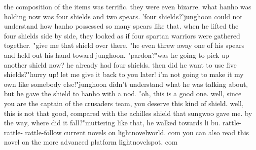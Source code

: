 the composition of the items was terrific.
 they were even bizarre.
what hanho was holding now was four shields and two spears.
'four shields?'junghoon could not understand how hanho possessed so many spears like that.
 when he lifted the four shields side by side, they looked as if four spartan warriors were gathered together.
"give me that shield over there.
"he even threw away one of his spears and held out his hand toward junghoon.
"pardon?"was he going to pick up another shield now? he already had four shields.
 then did he want to use five shields?"hurry up! let me give it back to you later! i'm not going to make it my own like somebody else!"junghoon didn't understand what he was talking about, but he gave the shield to hanho with a nod.
"oh, this is a good one.
 well, since you are the captain of the crusaders team, you deserve this kind of shield.
 well, this is not that good, compared with the achilles shield that sungwoo gave me.
 by the way, where did it fall?"muttering like that, he walked towards li bu.
 rattle- rattle- rattle-follow current novels on lightnovelworld.
com you can also read this novel on the more advanced platform lightnovelspot.
com

 